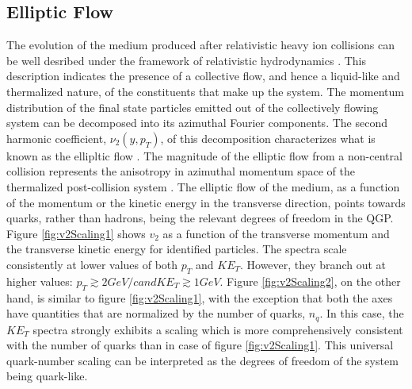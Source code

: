 \subsection{Elliptic Flow}
The evolution of the medium produced after relativistic heavy ion collisions can be well desribed under the framework of relativistic hydrodynamics \cite{SCHENKE2017105,2014NuPhA.926...92S}. This description indicates the presence of a collective flow, and hence a liquid-like and thermalized nature, of the constituents that make up the system. The momentum distribution of the final state particles emitted out of the collectively flowing system can be decomposed into its azimuthal Fourier components. The second harmonic coefficient, $\nu_{2}(y,p_{T})$, of this decomposition characterizes what is known as the ellipltic flow \cite{2001PhLB..503...58H}. The magnitude of the elliptic flow from a non-central collision represents the anisotropy in azimuthal momentum space of the thermalized post-collision system \cite{2011NJPh...13e5008S}.
The elliptic flow of the medium, as a function of the momentum or the kinetic energy in the transverse direction, points towards quarks, rather than hadrons, being the relevant degrees of freedom in the QGP. Figure \ref{fig:v2Scaling1} shows $v_{2}$ as a function of the transverse momentum and the transverse kinetic energy for identified particles. The spectra scale consistently at lower values of both $p_{T}$ and $KE_{T}$. However, they branch out at higher values: $p_{T} \gtrsim 2 GeV/c and KE_{T} \gtrsim 1 GeV$. Figure \ref{fig:v2Scaling2}, on the other hand, is similar to figure \ref{fig:v2Scaling1}, with the exception that both the axes have quantities that are normalized by the number of quarks, $n_{q}$. In this case, the $KE_{T}$ spectra strongly exhibits a scaling which is more comprehensively consistent with the number of quarks than in case of figure \ref{fig:v2Scaling1}. This universal quark-number scaling can be interpreted as the degrees of freedom of the system being quark-like.\cite{2007PhRvL..98p2301A}
